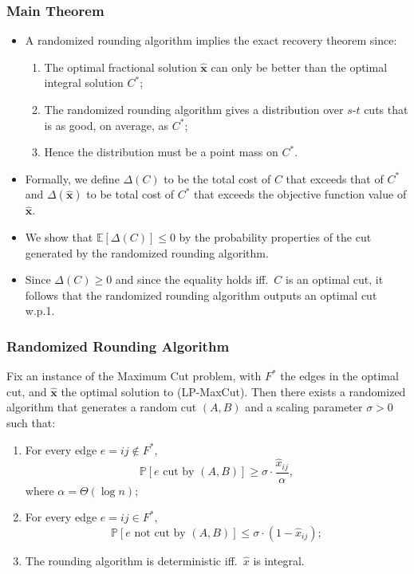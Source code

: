 \documentclass{beamer}
\newcommand{\EE}{\mathbb{E}}
\newcommand{\PP}{\mathbb{P}}
\begin{document}
    \begin{frame}
        \frametitle{Main Theorem}

        \begin{itemize}
            \item A randomized rounding algorithm implies the exact recovery theorem since: \pause
            \begin{enumerate}
                \item The optimal fractional solution $\mathbf{\hat x}$ can only be better than the optimal integral solution $C^*$; \pause
                \item The randomized rounding algorithm gives a distribution over $s$-$t$ cuts that is as good, on average, as $C^*$; \pause
                \item Hence the distribution must be a point mass on $C^*$.
            \end{enumerate}
            \pause
            \item Formally, we define $\Delta(C)$ to be the total cost of $C$ that exceeds that of $C^*$ and $\Delta(\mathbf{\hat x})$ to be total cost of $C^*$ that exceeds the objective function value of $\mathbf{\hat x}$. \pause
            \item We show that $\EE[\Delta(C)] \leq 0$ by the probability properties of the cut generated by the randomized rounding algorithm. \pause
            \item Since $\Delta(C) \geq 0$ and since the equality holds iff.\ $C$ is an optimal cut, it follows that the randomized rounding algorithm outputs an optimal cut w.p.1.
        \end{itemize}
    \end{frame}

    \begin{frame}
        \frametitle{Randomized Rounding Algorithm}
    
        \begin{lemma}
            Fix an instance of the {\sc Maximum Cut} problem, with $F^*$ the edges in the optimal cut, and $\mathbf{\hat x}$ the optimal solution to {\sc (LP-MaxCut)}. Then there exists a randomized algorithm that generates a random cut $(A, B)$ and a scaling parameter $\sigma > 0$ such that:
            \begin{enumerate}
                \item For every edge $e = ij \not \in F^*$,
                $$ \PP[\text{$e$ cut by $(A, B)$}] \geq \sigma \cdot \frac{\hat x_{ij}}{\alpha}, $$
                where $\alpha = \Theta(\log n)$;
                \item For every edge $e = ij \in F^*$,
                $$ \PP[\text{$e$ not cut by $(A, B)$}] \leq \sigma \cdot (1 - \hat x_{ij}); $$
                \item The rounding algorithm is deterministic iff.\ $\hat x$ is integral.
            \end{enumerate}
        \end{lemma}
    \end{frame}
\end{document}
